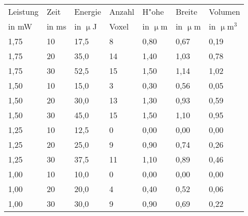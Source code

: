 

\appendix

{}	%
{}	%

\setcounter{figure}{0}

\begin{table}%
\centering
\caption{}
\begin{tabular}{lllllll}
\toprule
 
Leistung&Zeit&Energie&Anzahl&H"ohe &Breite&Volumen\\
in mW&in ms&in $\upmu$J&Voxel&in $\upmu$m&in $\upmu$m&in $\upmu$m$^3$\\
\midrule
1,75&10&17,5&8&0,80&0,67&0,19\\
1,75&20&35,0&14&1,40&1,03&0,78\\
1,75&30&52,5&15&1,50&1,14&1,02\\
1,50&10&15,0&3&0,30&0,56&0,05\\
1,50&20&30,0&13&1,30&0,93&0,59\\
1,50&30&45,0&15&1,50&1,10&0,95\\
1,25&10&12,5&0&0,00&0,00&0,00\\
1,25&20&25,0&9&0,90&0,74&0,26\\
1,25&30&37,5&11&1,10&0,89&0,46\\
1,00&10&10,0&0&0,00&0,00&0,00\\
1,00&20&20,0&4&0,40&0,52&0,06\\
1,00&30&30,0&9&0,90&0,69&0,22\\

\bottomrule 
\end{tabular}

\label{tab:Voxel}
\end{table}

